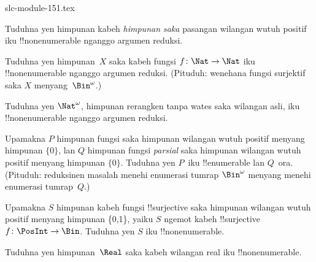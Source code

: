 \begin{filecontents*}[overwrite]{slc-module-151.tex}
\begin{prob}
Tuduhna yen himpunan kabeh \emph{himpunan saka} pasangan wilangan wutuh positif
iku !!{nonenumerable} nganggo argumen reduksi.
\end{prob}

\begin{prob}\label{sfr:siz:red:prob:nat-nat}
  Tuduhna yen himpunan~$X$ saka kabeh fungsi $f\colon \Nat \to \Nat$
  iku !!{nonenumerable} nganggo argumen reduksi. (Pituduh: wenehana fungsi
  surjektif saka $X$ menyang~$\Bin^\omega$.)
\end{prob}

\begin{prob}
Tuduhna yen $\Nat^\omega$, himpunan rerangken tanpa wates saka
wilangan asli, iku !!{nonenumerable} nganggo argumen reduksi.
\end{prob}

\begin{prob}
Upamakna $P$ himpunan fungsi saka himpunan wilangan wutuh positif
menyang himpunan $\{0\}$, lan $Q$ himpunan fungsi \emph{parsial}
saka himpunan wilangan wutuh positif menyang himpunan $\{0\}$.
Tuduhna yen $P$~iku !!{enumerable} lan $Q$~ora. (Pituduh: reduksinen
  masalah menehi enumerasi tumrap $\Bin^\omega$ menyang menehi enumerasi tumrap~$Q$.)
\end{prob}

\begin{prob}
Upamakna $S$ himpunan kabeh fungsi !!{surjective} saka himpunan
wilangan wutuh positif menyang himpunan \{0,1\}, yaiku $S$ ngemot kabeh
!!{surjective}~$f\colon \PosInt \to \Bin$. Tuduhna yen $S$ iku
!!{nonenumerable}.
\end{prob}

\begin{prob}
Tuduhna yen himpunan~$\Real$ saka kabeh wilangan real iku !!{nonenumerable}.
\end{prob}


\end{filecontents*}

